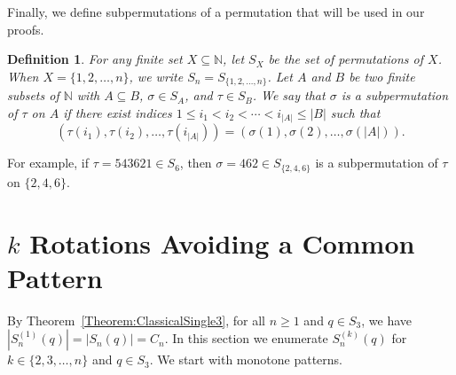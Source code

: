 \documentclass[10pt,a4paper]{amsart}
\newtheorem{definition}[theorem]{Definition}
\numberwithin{equation}{section}
\begin{document}
Finally, we define subpermutations of a permutation that will be used in our proofs.

\begin{definition}
For any finite set $X\subseteq\mathbb{N}$, let $S_X$ be the set of permutations of $X$. When $X=\{1,2,\ldots,n\}$, we write $S_n=S_{\{1,2,\ldots,n\}}$. Let $A$ and $B$ be two finite subsets of $\mathbb{N}$ with $A\subseteq B$, $\sigma\in S_A$, and $\tau\in S_B$. We say that $\sigma$ is a 
{\em subpermutation} of $\tau$ on $A$ if 
there exist indices $1 \leq i_1<i_2<\cdots<i_{|A|} \leq |B|$ such that
    \[
    (\tau(i_1),\tau(i_2),\ldots,\tau(i_{|A|}))=(\sigma(1),\sigma(2),\ldots,\sigma(|A|)).
    \]
\end{definition}
For example, if  $\tau=543621\in S_6$, 
then $\sigma=462\in S_{\{2,4,6\}}$ is a subpermutation of $\tau$ on $\{2,4,6\}$.

\section{$k$ Rotations Avoiding a Common Pattern}\label{Section:SinglePattern3}
By Theorem~\ref{Theorem:ClassicalSingle3}, for all $n\geq1$ and $q\in S_3$, we have $|S_n^{(1)}(q)|=|S_n(q)|=C_n$. In this section we enumerate $S_n^{(k)}(q)$ for $k\in\{2,3,\ldots,n\}$ and $q\in S_3$. We start with monotone patterns.
\end{document}

